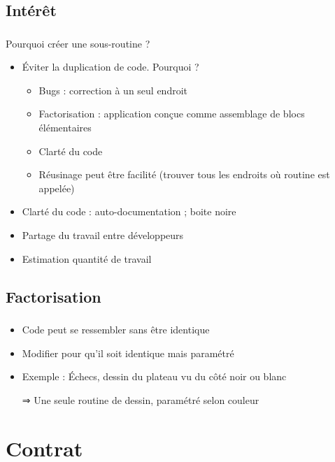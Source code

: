\documentclass[english, french]{beamer}
\begin{document}
\subsection{Intérêt}
\begin{frame}
	\frametitle{\subsecname}
	Pourquoi créer une sous-routine ?
	\begin{itemize}
		\item Éviter la duplication de code. Pourquoi ? \pause
		\begin{itemize}
			\item Bugs : correction à un seul endroit
			\item Factorisation : application conçue comme assemblage de blocs élémentaires
			\item Clarté du code
			\item Réusinage peut être facilité (trouver tous les endroits où routine est appelée)
		\end{itemize}\pause
		\item Clarté du code : auto-documentation ; boite noire
		\item Partage du travail entre développeurs
		\item Estimation quantité de travail
	\end{itemize}
\end{frame}

\subsection{Factorisation}
\begin{frame}
	\frametitle{\subsecname}
	\begin{itemize}
		\item Code peut se ressembler sans être identique
		\item Modifier pour qu’il soit identique mais paramétré
		\item Exemple : Échecs, dessin du plateau vu du côté noir ou blanc
		\item[⇒] Une seule routine de dessin, paramétré selon couleur
	\end{itemize}
\end{frame}

\section{Contrat}
\end{document}
